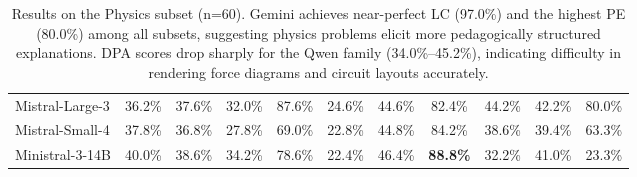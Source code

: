 \documentclass[11pt]{article}
\begin{document}
\begin{table}[!ht]
{\begin{tabular}{lcccc|cccc|cc}
Mistral-Large-3        & 36.2\% & 37.6\% & 32.0\% & 87.6\% & 24.6\% & 44.6\% & 82.4\% & 44.2\% & 42.2\% & 80.0\% \\
Mistral-Small-4        & 37.8\% & 36.8\% & 27.8\% & 69.0\% & 22.8\% & 44.8\% & 84.2\% & 38.6\% & 39.4\% & 63.3\% \\
Ministral-3-14B        & 40.0\% & 38.6\% & 34.2\% & 78.6\% & 22.4\% & 46.4\% & \textbf{88.8\%} & 32.2\% & 41.0\% & 23.3\% \\
\bottomrule
\end{tabular}}
\caption{Results on the Physics subset (n=60). Gemini achieves near-perfect LC (97.0\%) and the highest PE (80.0\%) among all subsets, suggesting physics problems elicit more pedagogically structured explanations. DPA scores drop sharply for the Qwen family (34.0\%--45.2\%), indicating difficulty in rendering force diagrams and circuit layouts accurately.}
\label{tab:results-physics}
\end{table}
\end{document}
